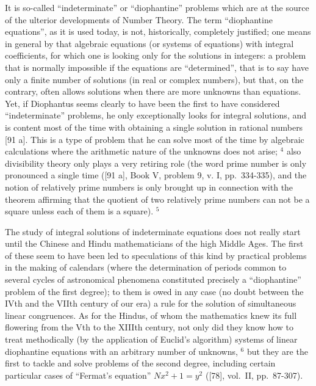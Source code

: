 It is so-called ``indeterminate'' or ``diophantine'' problems which are at the source of the ulterior developments of Number Theory. The term ``diophantine equations'', as it is used today, is not, historically, completely justified; one means in general by that algebraic equations (or systems of equations) with integral coefficients, for which one is looking only for the solutions in integers: a problem that is normally impossible if the equations are ``determined'', that is to say have only a finite number of solutions (in real or complex numbers), but that, on the contrary, often allows solutions when there are more unknowns than equations. Yet, if Diophantus seems clearly to have been the first to have considered ``indeterminate'' problems, he only exceptionally looks for integral solutions, and is content most of the time with obtaining a single solution in rational numbers {[}91 a{]}. This is a type of problem that he can solve most of the time by algebraic calculations where the arithmetic nature of the unknowns does not arise; \(^{4}\) also divisibility theory only plays a very retiring role (the word prime number is only pronounced a single time ({[}91 a{]}, Book V, problem 9, v. I, pp.~334-335), and the notion of relatively prime numbers is only brought up in connection with the theorem affirming that the quotient of two relatively prime numbers can not be a square unless each of them is a square). \(^{5}\)

The study of integral solutions of indeterminate equations does not really start until the Chinese and Hindu mathematicians of the high Middle Ages. The first of these seem to have been led to speculations of this kind by practical problems in the making of calendars (where the determination of periods common to several cycles of astronomical phenomena constituted precisely a ``diophantine'' problem of the first degree); to them is owed in any case (no doubt between the IVth and the VIIth century of our era) a rule for the solution of simultaneous linear congruences. As for the Hindus, of whom the mathematics knew its full flowering from the Vth to the XIIIth century, not only did they know how to treat methodically (by the application of Euclid's algorithm) systems of linear diophantine equations with an arbitrary number of unknowns, \(^{6}\) but they are the first to tackle and solve problems of the second degree, including certain particular cases of ``Fermat's equation'' \(Nx^{2} + 1 = y^{2}\) ({[}78{]}, vol.~II, pp.~87-307).

